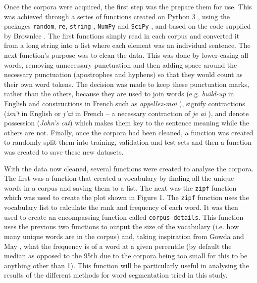 \documentclass[11pt]{article}
\begin{document}
Once the corpora were acquired, the first step was the prepare them for use. This was achieved through a series of functions created on Python 3 \citep{python3}, using the packages \texttt{random}, \texttt{re}, \texttt{string} \citep{python-random}, \texttt{NumPy} \citep{2020NumPy-Array} and \texttt{SciPy} \citep{2020SciPy-NMeth}, and based on the code supplied by Brownlee \citeyearpar{brownlee_2018}. The first functions simply read in each corpus and converted it from a long string into a list where each element was an individual sentence. The next function's purpose was to clean the data. This was done by lower-casing all words, removing unnecessary punctuation and then adding space around the necessary punctuation (apostrophes and hyphens) so that they would count as their own word tokens. The decision was made to keep these punctuation marks, rather than the others, because they are used to join words (e.g. \textit{build-up} in English and constructions in French such as \textit{appellez-moi}%
), signify contractions (\textit{isn’t} in English or \textit{j’ai} in French -- a necessary contraction of \textit{je ai}%
), and denote possession (\textit{John’s cat}) which makes them key to the sentence meaning while the others are not. Finally, once the corpora had been cleaned, a function was created to randomly split them into training, validation and test sets and then a function was created to save these new datasets.

\bigskip

With the data now cleaned, several functions were created to analyse the corpora. The first was a function that created a vocabulary by finding all the unique words in a corpus and saving them to a list. The next was the \texttt{zipf} function which was used to create the plot shown in Figure 1. The \texttt{zipf} function uses the vocabulary list to calculate the rank and frequency of each word. It was then used to create an encompassing function called \texttt{corpus\_details}. This function uses the previous two functions to output the size of the vocabulary (i.e. how many unique words are in the corpus) and, taking inspiration from Gowda and May \citeyearpar{gowda-may-2020-finding}, what the frequency is of a word at a given percentile (by default the median as opposed to the 95th due to the corpora being too small for this to be anything other than 1). This function will be particularly useful in analysing the results of the different methods for word segmentation tried in this study.
\end{document}
